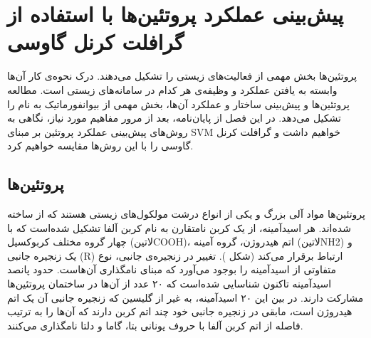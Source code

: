\chapter{پیش‌بینی عملکرد پروتئین‌ها با استفاده از گرافلت کرنل گاوسی}\label{chap:protein_function_prediction}

پروتئین‌ها بخش مهمی از فعالیت‌های زیستی را تشکیل می‌دهند. درک نحوه‌ی کار آن‌ها وابسته به یافتن عملکرد و وظیفه‌ی هر کدام در سامانه‌های زیستی است. مطالعه پروتئین‌ها و پیش‌بینی ساختار و عملکرد آن‌ها، بخش مهمی از بیوانفورماتیک به نام  را تشکیل می‌دهد. در این فصل از پایان‌نامه، بعد از مرور مفاهیم مورد نیاز، نگاهی به روش‌های پیش‌بینی عملکرد پروتئین بر مبنای SVM خواهیم داشت و گرافلت کرنل گاوسی را با این روش‌ها مقایسه خواهیم کرد.

\section{پروتئین‌ها}\label{sec:protein-structure}
پروتئین‌ها مواد آلی بزرگ و یکی از انواع درشت مولکول‌های زیستی هستند که از  ساخته شده‌اند. هر اسیدآمینه، از یک کربن نامتقارن به نام کربن آلفا تشکیل شده‌است که با چهار گروه مختلف کربوکسیل (‌لاتین{COOH})، اتم هیدروژن، گروه آمینه (‌لاتین{NH2}) و یک زنجیره جانبی (R) ارتباط برقرار می‌کند (شکل ). تغییر در زنجیره‌ی جانبی، نوع متفاوتی از اسیدآمینه را بوجود می‌آورد که مبنای نامگذاری آن‌هاست. حدود پانصد اسیدآمینه تاکنون شناسایی شده‌است که ۲۰ عدد از آن‌ها در ساختمان پروتئین‌ها مشارکت دارند. در بین این ۲۰ اسیدآمینه، به غیر از گلیسین که زنجیره جانبی آن یک اتم هیدروژن است، مابقی در زنجیره جانبی خود چند اتم کربن دارند که آن‌ها را به ترتیب فاصله از اتم کربن آلفا با حروف یونانی بتا، گاما و دلتا نامگذاری می‌کنند.

